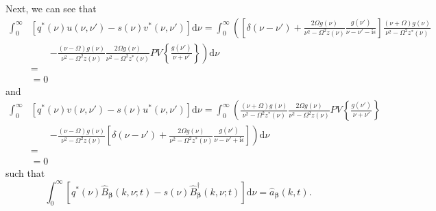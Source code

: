 \documentclass{article}
\begin{document}
Next, we can see that
\begin{equation}
\begin{split}
\int_0^\infty&\left[q^*(\nu)u(\nu,\nu') - s(\nu)v^*(\nu,\nu')\right]\mathrm{d}\nu = \int_0^\infty\left(\left[\delta(\nu - \nu') + \frac{2\Omega g(\nu)}{\nu^2 - \Omega^2z(\nu)}\frac{g(\nu')}{\nu - \nu' - \mathrm{i}\epsilon}\right]\frac{(\nu + \Omega)g(\nu)}{\nu^2 - \Omega^2z^*(\nu)}\right.\\
&\qquad\left. - \frac{(\nu - \Omega)g(\nu)}{\nu^2 - \Omega^2z(\nu)}\frac{2\Omega g(\nu)}{\nu^2 - \Omega^2z^*(\nu)}PV\left\{\frac{g(\nu')}{\nu + \nu'}\right\}\right)\mathrm{d}\nu\\[0.5em]
&= \\
&= 0
\end{split}
\end{equation}
and
\begin{equation}
\begin{split}
\int_0^\infty&\left[q^*(\nu)v(\nu,\nu') - s(\nu)u^*(\nu,\nu')\right]\mathrm{d}\nu = \int_0^\infty\left(\frac{(\nu + \Omega)g(\nu)}{\nu^2 - \Omega^2z^*(\nu)}\frac{2\Omega g(\nu)}{\nu^2 - \Omega^2z(\nu)}PV\left\{\frac{g(\nu')}{\nu + \nu'}\right\}\right.\\
&\qquad\left. - \frac{(\nu - \Omega)g(\nu)}{\nu^2 - \Omega^2z(\nu)}\left[\delta(\nu - \nu') + \frac{2\Omega g(\nu)}{\nu^2 - \Omega^2z^*(\nu)}\frac{g(\nu')}{\nu - \nu' + \mathrm{i}\epsilon}\right]\right)\mathrm{d}\nu\\[0.5em]
&= \\
&= 0
\end{split}
\end{equation}
such that
\begin{equation}
\int_0^\infty\left[q^*(\nu)\hat{B}_{\bm{\beta}}(k,\nu;t) - s(\nu)\hat{B}_{\bm{\beta}}^\dagger(k,\nu;t)\right]\mathrm{d}\nu = \hat{a}_{\bm{\beta}}(k,t).
\end{equation}
\end{document}

